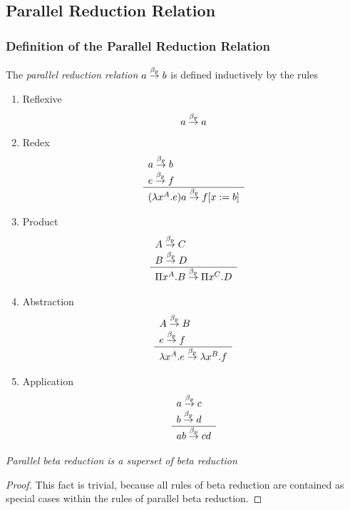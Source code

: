 \subsection{Parallel Reduction Relation}


\subsubsection{Definition of the Parallel Reduction Relation}

\begin{definition}
    The \emph{parallel reduction relation} $a \stackrel{\beta_p}{\to} b$ is defined inductively
    by the rules
    \begin{enumerate}
    \item Reflexive
    $$
        a \stackrel{\beta_p}{\to} a
    $$

    \item Redex
    $$
        \begin{array}{l} 
            a \stackrel{\beta_p}{\to} b
            \\
            e \stackrel{\beta_p}{\to} f
         \\ \hline 
            (\lambda x^A. e) a \stackrel{\beta_p}{\to} f[x:=b]
        \end{array}
    $$

    \item Product
    $$
    \begin{array}{l} 
        A \stackrel{\beta_p}{\to} C
        \\
        B \stackrel{\beta_p}{\to} D
     \\ \hline 
        \Pi x^A. B \stackrel{\beta_p}{\to} \Pi x^C. D
    \end{array}
    $$

    \item Abstraction
    $$
    \begin{array}{l} 
        A \stackrel{\beta_p}{\to} B
        \\
        e \stackrel{\beta_p}{\to} f
     \\ \hline 
        \lambda x^A. e \stackrel{\beta_p}{\to} \lambda x^B. f
    \end{array}
    $$

    \item Application
    $$
    \begin{array}{l} 
        a \stackrel{\beta_p}{\to} c
        \\
        b \stackrel{\beta_p}{\to} d
     \\ \hline 
        a b \stackrel{\beta_p}{\to} c d
    \end{array}
    $$
    \end{enumerate}
\end{definition}


\begin{lemma}
    \emph{Parallel beta reduction is a superset of beta reduction}

    \begin{proof} This fact is trivial, because all rules of beta reduction are
    contained as special cases within the rules of parallel beta reduction.
    \end{proof}
\end{lemma}



